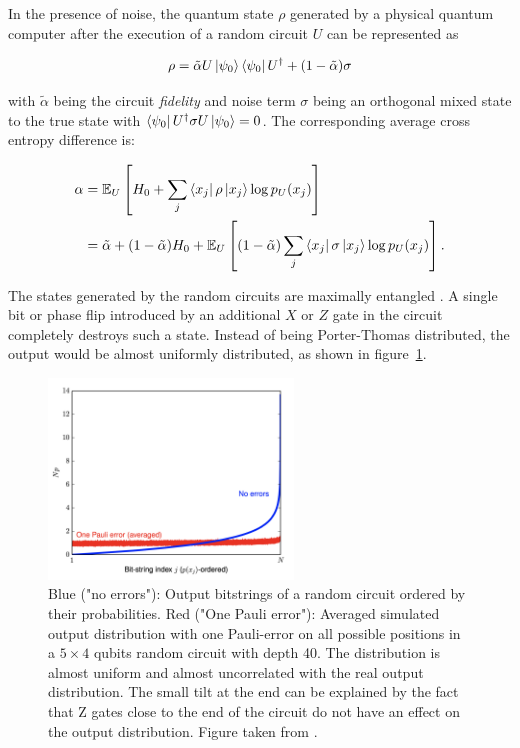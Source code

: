 In the presence of noise, the quantum state $\rho$ generated by a physical quantum computer
after the execution of a random circuit $U$ can be represented as

\begin{equation}
  \rho = \tilde{\alpha} U \Ket{\psi_0} \Bra{\psi_0} U^{\dagger} + (1- \tilde{\alpha}) \sigma
\end{equation}

with $\tilde{\alpha}$ being the circuit \textit{fidelity} and noise term $\sigma$ being an orthogonal mixed state to the true state with
$\Bra{\psi_0}U^{\dagger}\sigma U \Ket{\psi_0} = 0$.
The corresponding average cross entropy difference is:

\begin{align}
  \alpha &= \mathbb{E}_U\left[H_0+ \sum_j \Bra{x_j} \rho \Ket{x_j} \log{p_U(x_j)} \right] \\
         &= \tilde{\alpha} + (1-\tilde{\alpha})H_0 + \mathbb{E}_U\left[(1-\tilde{\alpha}) \sum_j \Bra{x_j} \sigma \Ket{x_j} \log{p_U(x_j)}\right].
\end{align}

The states generated by the random circuits are
maximally entangled \cite{Boixo2018supremacy}. A single bit or phase flip introduced by an additional $ X $ or $ Z $ gate in the circuit completely destroys such a state. Instead of being Porter-Thomas distributed, the output would be almost uniformly distributed, as shown in figure~\ref{fig:rcs_noise}.

\begin{figure}[H]
  \centering
  \includegraphics[width=0.58\textwidth]{figures/rcs_noise}
  \caption[Effect of one Pauli-Error on Random Circuits]{Blue ("no errors"): Output bitstrings of a random circuit ordered by their probabilities. Red ("One Pauli error"): Averaged 
  simulated output distribution with one Pauli-error on all possible positions in a $5 \times 4$ qubits random circuit 
  with depth 40. The distribution is almost uniform and almost uncorrelated with the real output distribution. The small tilt at 
  the end can be explained by the fact that Z gates close to the end of the circuit do not have an effect on the output distribution. Figure taken from \cite{Boixo2018supremacy}.}
  \label{fig:rcs_noise}
\end{figure}

